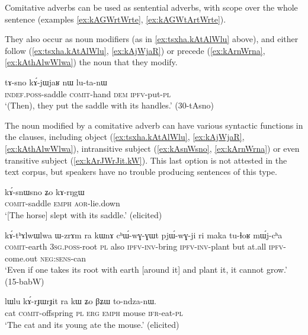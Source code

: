 Comitative adverbs can be used as sentential adverbs, with scope over the whole sentence (examples \ref{ex:kAGWrtWrte}, \ref{ex:kAGWtArtWrte}). 


They also occur as noun modifiers (as in \ref{ex:tsxha.kAtAlWlu} above), and either follow (\ref{ex:tsxha.kAtAlWlu}, \ref{ex:kAjWjaR}) or precede (\ref{ex:kArnWrna}, \ref{ex:kAthAlwWlwa}) the noun that they modify.


\begin{exe}
\ex \label{ex:kAjWjaR}
\gll tɤ-sno kɤ́-jɯ\redp{}jaʁ nɯ lu-ta-nɯ \\
\textsc{indef}.\textsc{poss}-saddle \textsc{comit}-hand \textsc{dem} \textsc{ipfv}-put-\textsc{pl} \\
\glt `(Then), they put the saddle with its handles.' (30-tAsno) 
\end{exe}
 

The noun modified by a comitative adverb can have various syntactic functions in the clauses, including object (\ref{ex:tsxha.kAtAlWlu}, \ref{ex:kAjWjaR}, \ref{ex:kAthAlwWlwa}), intransitive subject (\ref{ex:kAsnWsno}, \ref{ex:kArnWrna}) or even transitive subject (\ref{ex:kArJWrJit.kW}). This last option is not attested in the text corpus, but speakers have no trouble producing sentences of this type.


\begin{exe}
	\ex \label{ex:kAsnWsno}
	\gll kɤ́-snɯ\tld{}sno ʑo kɤ-rŋgɯ \\
	\textsc{comit}-saddle \textsc{emph} \textsc{aor}-lie.down \\
	\glt `[The horse] slept with its saddle.' (elicited)
\end{exe}


\begin{exe}
\ex \label{ex:kAthAlwWlwa}
\gll kɤ́-tʰɤlwɯ\tld{}lwa ɯ-zrɤm ra kɯnɤ cʰɯ́-wɣ-ɣɯt pjɯ́-wɣ-ji ri maka tu-ɬoʁ mɯ́j-cʰa \\ 
\textsc{comit}-earth \textsc{3sg}.\textsc{poss}-root \textsc{pl} also \textsc{ipfv}-\textsc{inv}-bring \textsc{ipfv}-\textsc{inv}-plant but at.all \textsc{ipfv}-come.out \textsc{neg}:\textsc{sens}-can \\
\glt `Even if one takes its root with earth [around it] and plant it, it cannot grow.' (15-babW)
\end{exe}


\begin{exe}
\ex \label{ex:kArJWrJit.kW}
\gll lɯlu kɤ́-rɟɯ\tld{}rɟit ra kɯ ʑo βʑɯ to-ndza-nɯ. \\
cat \textsc{comit}-offspring \textsc{pl} \textsc{erg} \textsc{emph} mouse \textsc{ifr}-eat-\textsc{pl} \\
\glt `The cat and its young ate the mouse.' (elicited)
\end{exe}

